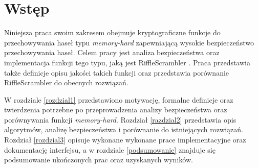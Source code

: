 \chapter{Wstęp}
\thispagestyle{chapterBeginStyle}


Niniejsza praca swoim zakresem obejmuje kryptograficzne funkcje do przechowywania haseł typu \textit{memory-hard} zapewniającą wysokie bezpieczeństwo przechowywania haseł.
Celem pracy jest analiza bezpieczeństwa oraz implementacja funkcji tego typu, jaką jest RiffleScrambler \cite{rs}. Praca przedstawia także definicje opisu jakości takich funkcji oraz przedstawia porównanie RiffleScrambler do obecnych rozwiązań.

W rozdziale \ref{rozdzial1} przedstawiono motywację, formalne definicje oraz twierdzenia potrzebne po przeprowadzenia analizy bezpieczeństwa oraz porównywania funkcji \textit{memory-hard}.
Rozdział \ref{razdzial2} przedstawia opis algorytmów, analizę bezpieczeństwa i porównanie do istniejących rozwiązań.
Rozdział \ref{rozdzial3} opisuje wykonane wykonane prace implementacyjne oraz dokumentację interfejsu, a w rozdziale \ref{podsumowanie} znajduje się podsumowanie ukończonych prac oraz uzyskanych wyników.

